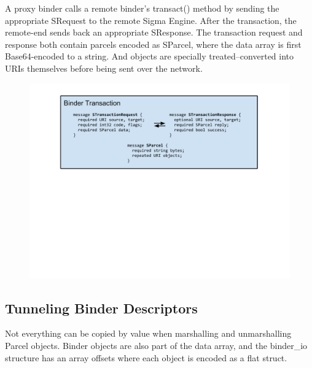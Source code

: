 \documentclass[prodmode]{acmlarge}
\begin{document}
A proxy binder calls a remote binder's transact() method by sending the appropriate SRequest to the remote Sigma Engine. After the transaction, the remote-end sends back an appropriate SResponse. The transaction request and response both contain parcels encoded as SParcel, where the data array is first Base64-encoded to a string. And objects are specially treated--converted into URIs themselves before being sent over the network.
\begin{figure}[h]
\centering
\includegraphics[width=\columnwidth]{drawings/WireBinderTransaction.pdf}
\end{figure}


\subsection{Tunneling Binder Descriptors}
Not everything can be copied by value when marshalling and unmarshalling Parcel objects. Binder objects are also part of the data array, and the binder\_io structure has an array offsets where each object is encoded as a flat struct.
\end{document}
